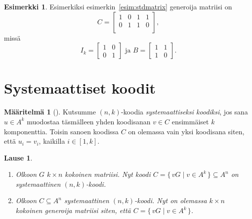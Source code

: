 \documentclass[a4paper,12pt,leqno,oneside]{report} %
\theoremstyle{plain}
\newtheorem{lause}{Lause}[chapter]
\theoremstyle{definition}
\newtheorem{maaritelma}{Määritelmä}[chapter]
\newtheorem{esimerkki}{Esimerkki}[chapter]
\theoremstyle{remark}
\numberwithin{equation}{chapter}
\begin{document}
    \begin{esimerkki}
        Esimerkiksi esimerkin~\ref{esim:stdmatrix} generoija matriisi on
        \[
            C =
            \begin{bmatrix}
                1 & 0 & 1 & 1\\
                0 & 1 & 1 & 0\\
            \end{bmatrix},
        \]
        missä
        \[
            I_k = 
            \begin{bmatrix}
                1 & 0 \\
                0 & 1
            \end{bmatrix}\text{ ja }
            B =
            \begin{bmatrix}
                1 & 1 \\
                1 & 0
            \end{bmatrix}.
        \]
    \end{esimerkki}

    \section{Systemaattiset koodit}

    \begin{maaritelma}[{\cite[s.~498]{PA}}]\label{maar:systemaattinen}
        Kutsumme $(n, k)$-koodia \emph{systemaattiseksi koodiksi}, jos sana $u \in A^k$ muodostaa täsmälleen yhden koodisanan $v \in C$ ensimmäiset $k$ komponenttia. Toisin sanoen koodissa $C$ on olemassa vain yksi koodisana  siten, että $u_i = v_i$, kaikilla $i \in [1,k]$.
    \end{maaritelma}

    \begin{lause}\label{lause:systemaattinen}
        \mbox{}
        \begin{enumerate}
            \item\label{kht:sysmatr} Olkoon $G$ $k \times n$ kokoinen matriisi. Nyt koodi $C = \{\, vG \mid v \in A^k\,\} \subseteq A^n$ on systemaattinen $(n, k)$-koodi.
            \item\label{kht:sysgenmatr} Olkoon $C \subseteq A^n$ systemaattinen $(n, k)$-koodi. Nyt on olemassa $k \times n$ kokoinen generoija matriisi siten, että $C = \{\, vG \mid v \in A^k\,\}$.
        \end{enumerate}
    \end{lause}
\end{document}
